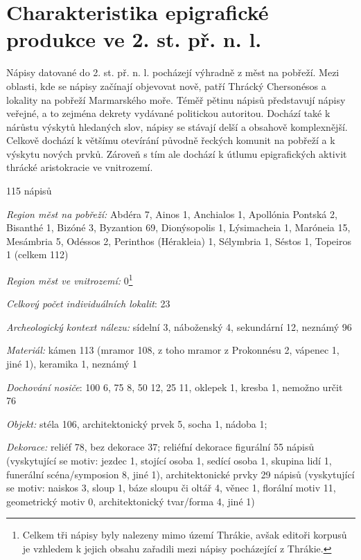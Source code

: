 
\section[charakteristika-epigrafické-produkce-ve-2.-st.-př.-n.-l.]{Charakteristika epigrafické produkce ve 2. st. př. n. l.}

Nápisy datované do 2. st. př. n. l. pocházejí výhradně z měst na pobřeží. Mezi oblasti, kde se nápisy začínají objevovat nově, patří Thrácký Chersonésos a lokality na pobřeží Marmarského moře. Téměř pětinu nápisů představují nápisy veřejné, a to zejména dekrety vydávané politickou autoritou. Dochází také k nárůstu výskytů hledaných slov, nápisy se stávají delší a obsahově komplexnější. Celkově dochází k většímu otevírání původně řeckých komunit na pobřeží a k výskytu nových prvků. Zároveň s tím ale dochází k útlumu epigrafických aktivit thrácké aristokracie ve vnitrozemí.

\placetable[none]{}
\starttable[|l|]
\HL
{} 115 nápisů

{\em Region měst na pobřeží:} Abdéra 7, Ainos 1, Anchialos 1, Apollónia Pontská 2, Bisanthé 1, Bizóné 3, Byzantion 69, Dionýsopolis 1, Lýsimacheia 1, Maróneia 15, Mesámbria 5, Odéssos 2, Perinthos (Hérakleia) 1, Sélymbria 1, Séstos 1, Topeiros 1 (celkem 112)

{\em Region měst ve vnitrozemí:} 0\footnote{Celkem tři nápisy byly nalezeny mimo území Thrákie, avšak editoři korpusů je vzhledem k jejich obsahu zařadili mezi nápisy pocházející z Thrákie.}

{\em Celkový počet individuálních lokalit}: 23

{\em Archeologický kontext nálezu:} sídelní 3, náboženský 4, sekundární 12, neznámý 96

{\em Materiál:} kámen 113 (mramor 108, z toho mramor z Prokonnésu 2, vápenec 1, jiné 1), keramika 1, neznámý 1

{\em Dochování nosiče}: 100  6, 75  8, 50  12, 25  11, oklepek 1, kresba 1, nemožno určit 76

{\em Objekt:} stéla 106, architektonický prvek 5, socha 1, nádoba 1;

{\em Dekorace:} reliéf 78, bez dekorace 37; reliéfní dekorace figurální 55 nápisů (vyskytující se motiv: jezdec 1, stojící osoba 1, sedící osoba 1, skupina lidí 1, funerální scéna/symposion 8, jiné 1), architektonické prvky 29 nápisů (vyskytující se motiv: naiskos 3, sloup 1, báze sloupu či oltář 4, věnec 1, florální motiv 11, geometrický motiv 0, architektonický tvar/forma 4, jiné 1)

